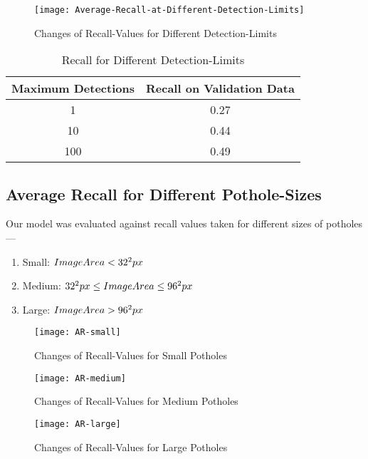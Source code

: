             \begin{figure}
                \centering
                \texttt{[image: Average-Recall-at-Different-Detection-Limits]}
                \caption{Changes of Recall-Values for Different Detection-Limits}
                \label{fig:recall_limits}
            \end{figure}
            
            \begin{table}
                \centering
                \begin{tabular}{|c||c|} \hline 
                     Maximum Detections  &  Recall on Validation Data \\\hline\hline
                     1  &  0.27 \\\hline
                     10  &  0.44 \\\hline
                     100  &  0.49 \\\hline
                \end{tabular}
                \caption{Recall for Different Detection-Limits}
                \label{tab:recall_limits}
            \end{table}
            
        \clearpage
        \subsection{Average Recall for Different Pothole-Sizes}
            Our model was evaluated against recall values taken for different sizes of potholes---
            \begin{enumerate}
                \item {Small: $Image\-Area < 32^2 px$}
                \item {Medium: $32^2 px \leq Image\-Area \leq 96^2 px$}
                \item {Large: $Image\-Area > 96^2 px$}
            \end{enumerate}
            
            \begin{figure}[h]
                \centering
                \texttt{[image: AR-small]}
                \caption{Changes of Recall-Values for Small Potholes}
                \label{fig:recall_size_small}
            \end{figure}
            \begin{figure}[h]
                \centering
                \texttt{[image: AR-medium]}
                \caption{Changes of Recall-Values for Medium Potholes}
                \label{fig:recall_size_medium}
            \end{figure}
            \begin{figure}
                \centering
                \texttt{[image: AR-large]}
                \caption{Changes of Recall-Values for Large Potholes}
                \label{fig:recall_size_large}
            \end{figure}
            
